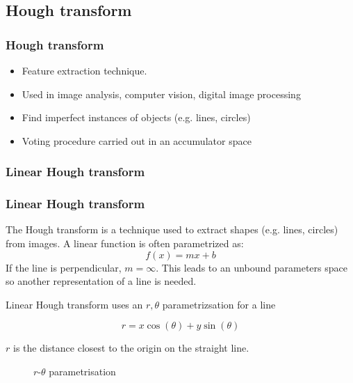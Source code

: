 \documentclass[10pt, xcolor={table}]{beamer}
\begin{document}
\subsection{Hough transform} %
\label{sub:linear_hough_transform}
\begin{frame}[c]
  \frametitle{Hough transform}


  \begin{itemize}
    \item Feature extraction technique.
    \item Used in image analysis, computer vision, digital image processing
    \item Find imperfect instances of objects (e.g. lines, circles)
    \item Voting procedure carried out in an accumulator space
  \end{itemize}
\end{frame}

\subsubsection{Linear Hough transform} %
\label{ssub:linear_hough_transform}

\begin{frame}[c,allowframebreaks]\frametitle{Linear Hough transform}
    
The Hough transform is a technique used to extract shapes (e.g. lines, circles) from images.
A linear function is often parametrized as:
\begin{equation}
  f(x) = mx + b
\end{equation}
If the line is perpendicular, $m = \infty$. This leads to an unbound parameters space so another representation of a line is needed.
\framebreak

Linear Hough transform uses an $r,\theta$ parametrizsation for a line

\begin{equation}
 r = x\cos(\theta) + y\sin(\theta)
\end{equation}

$r$ is the distance closest to the origin on the straight line.

\begin{figure}[ht]
  \centering
  \caption{$r\text{-}\theta$ parametrisation}
  \label{fig:rhotheta}
\end{figure}
\end{frame}
\end{document}

